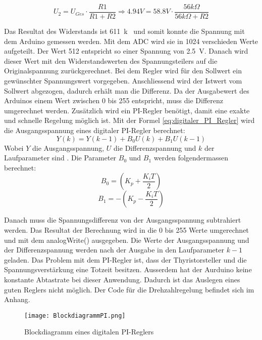 \begin{equation}
U_2=U_{Ges} \cdot\frac{R1}{R1 + R2} \Longrightarrow 4.94 V = 58.8 V \cdot \frac{56k\Omega}{56k\Omega + R2}
\end{equation}

Das Resultat des Widerstands ist \SI{611}{k\Omega} und somit konnte die Spannung mit dem Arduino gemessen werden. Mit dem ADC wird sie in 1024 verschieden Werte aufgeteilt. Der Wert 512 entspricht so einer Spannung von \SI{2.5}{V}. Danach wird dieser Wert mit den Widerstandswerten des Spannungsteilers auf die Originalspannung zurückgerechnet. Bei dem Regler wird für den Sollwert ein gewünschter Spannungswert vorgegeben. Anschliessend wird der Istwert vom Sollwert abgezogen, dadurch erhält man die Differenz. Da der Ausgabewert des Arduinos einem Wert zwischen 0 bis 255 entspricht, muss die Differenz umgerechnet werden. Zusätzlich wird ein PI-Regler benötigt, damit eine exakte und schnelle Regelung möglich ist.
Mit der Formel \ref{eq:digitaler_PI_Regler} wird die Ausgangsspannung eines digitaler PI-Regler berechnet: \cite{Quelle_Marco} 
\begin{equation}\label{eq:digitaler_PI_Regler}
Y(k) = Y(k-1)+ B_0U(k)+B_1U(k-1)
\end{equation}
Wobei $Y$ die Ausgangsspannung, $U$ die Differenzspannung und $k$ der Laufparameter sind \cite{PI_Regler}. Die Parameter $B_0$ und $B_1$ werden folgendermassen berechnet:
\begin{equation}\label{eq:B0}
B_0 = \left(K_p + \frac{K_iT}{2}\right) 
\end{equation}
\begin{equation}\label{eq:B1}
B_1 = -\left(K_p - \frac{K_iT}{2}\right) 
\end{equation}

Danach muss die Spannungsdifferenz von der Ausgangsspannung subtrahiert werden. Das Resultat der Berechnung wird in die 0 bis 255 Werte umgerechnet und mit dem analogWrite() ausgegeben. Die Werte der Ausgangsspannung und der Differenzspannung werden nach der Ausgabe in den Laufparameter $k-1$ geladen. Das Problem mit dem PI-Regler ist, dass der Thyristorsteller und die Spannungsverstärkung eine Totzeit besitzen. Ausserdem hat der Aurduino keine konstante Abtastrate bei dieser Anwendung. Dadurch ist das Auslegen eines guten Reglers nicht möglich. Der Code für die Drehzahlregelung befindet sich im Anhang. 

\begin{figure}[ht!]
	\centering
	\texttt{[image: BlockdiagrammPI.png]}	
	\caption{Blockdiagramm eines digitalen PI-Reglers}\label{fig:PIRegler}\cite{PI_Regler}
\end{figure}







